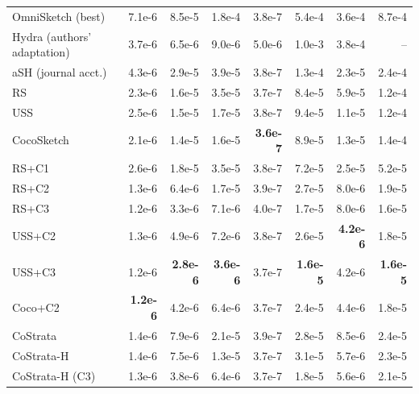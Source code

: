 \begin{tabular}{lrrrrrrr}
OmniSketch {\footnotesize(best)} & 7.1e-6 & 8.5e-5 & 1.8e-4 & 3.8e-7 & 5.4e-4 & 3.6e-4 & 8.7e-4 \\
\addlinespace[2pt]
Hydra {\footnotesize(authors' adaptation)} & 3.7e-6 & 6.5e-6 & 9.0e-6 & 5.0e-6 & 1.0e-3 & 3.8e-4 & -- \\
aSH {\footnotesize(journal acct.)} & 4.3e-6 & 2.9e-5 & 3.9e-5 & 3.8e-7 & 1.3e-4 & 2.3e-5 & 2.4e-4 \\
\addlinespace[2pt]
RS & 2.3e-6 & 1.6e-5 & 3.5e-5 & 3.7e-7 & 8.4e-5 & 5.9e-5 & 1.2e-4 \\
USS & 2.5e-6 & 1.5e-5 & 1.7e-5 & 3.8e-7 & 9.4e-5 & 1.1e-5 & 1.2e-4 \\
CocoSketch & 2.1e-6 & 1.4e-5 & 1.6e-5 & \textbf{3.6e-7} & 8.9e-5 & 1.3e-5 & 1.4e-4 \\
\addlinespace[2pt]
RS+C1 & 2.6e-6 & 1.8e-5 & 3.5e-5 & 3.8e-7 & 7.2e-5 & 2.5e-5 & 5.2e-5 \\
RS+C2 & 1.3e-6 & 6.4e-6 & 1.7e-5 & 3.9e-7 & 2.7e-5 & 8.0e-6 & 1.9e-5 \\
RS+C3 & 1.2e-6 & 3.3e-6 & 7.1e-6 & 4.0e-7 & 1.7e-5 & 8.0e-6 & 1.6e-5 \\
\addlinespace[2pt]
USS+C2 & 1.3e-6 & 4.9e-6 & 7.2e-6 & 3.8e-7 & 2.6e-5 & \textbf{4.2e-6} & 1.8e-5 \\
USS+C3 & 1.2e-6 & \textbf{2.8e-6} & \textbf{3.6e-6} & 3.7e-7 & \textbf{1.6e-5} & 4.2e-6 & \textbf{1.6e-5} \\
Coco+C2 & \textbf{1.2e-6} & 4.2e-6 & 6.4e-6 & 3.7e-7 & 2.4e-5 & 4.4e-6 & 1.8e-5 \\
\addlinespace[2pt]
CoStrata & 1.4e-6 & 7.9e-6 & 2.1e-5 & 3.9e-7 & 2.8e-5 & 8.5e-6 & 2.4e-5 \\
CoStrata-H & 1.4e-6 & 7.5e-6 & 1.3e-5 & 3.7e-7 & 3.1e-5 & 5.7e-6 & 2.3e-5 \\
CoStrata-H {\footnotesize(C3)} & 1.3e-6 & 3.8e-6 & 6.4e-6 & 3.7e-7 & 1.8e-5 & 5.6e-6 & 2.1e-5 \\
\bottomrule
\end{tabular}
